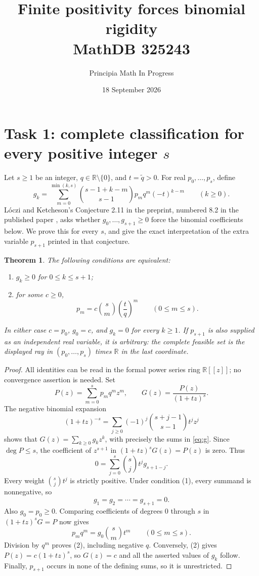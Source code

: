 \documentclass[11pt]{article}
\title{Finite positivity forces binomial rigidity\\\large MathDB 325243}
\author{Principia Math In Progress}
\date{18 September 2026}
\newtheorem{theorem}{Theorem}
\begin{document}
\maketitle

\section*{Task 1: complete classification for every positive integer $s$}
Let $s\ge1$ be an integer, $q\in\mathbb R\setminus\{0\}$, and
$t=\widetilde q>0$. For real $p_0,\ldots,p_s$, define
\begin{equation}\label{eq:g}
 g_k=\sum_{m=0}^{\min(k,s)}
 \binom{s-1+k-m}{s-1}p_mq^m(-t)^{k-m}\qquad(k\ge0).
\end{equation}
L\'oczi and Ketcheson's Conjecture 2.11 in the preprint, numbered
8.2 in the published paper \cite{LK}, asks whether
$g_0,\ldots,g_{s+1}\ge0$ force the binomial coefficients below.
We prove this for every $s$, and give the exact interpretation of
the extra variable $p_{s+1}$ printed in that conjecture.

\begin{theorem}\label{thm:main}
The following conditions are equivalent:
\begin{enumerate}
\item $g_k\ge0$ for $0\le k\le s+1$;
\item for some $c\ge0$,
\[
             p_m=c\binom{s}{m}\left(\frac tq\right)^m
                    \qquad(0\le m\le s).
\]
\end{enumerate}
In either case $c=p_0$, $g_0=c$, and $g_k=0$ for every $k\ge1$.
If $p_{s+1}$ is also supplied as an independent real variable,
it is arbitrary: the complete feasible set is the displayed ray
in $(p_0,\ldots,p_s)$ times $\mathbb R$ in the last coordinate.
\end{theorem}

\begin{proof}
All identities can be read in the formal power series ring
$\mathbb R[[z]]$; no convergence assertion is needed. Set
\[
 P(z)=\sum_{m=0}^s p_mq^m z^m,
 \qquad G(z)=\frac{P(z)}{(1+tz)^s}.
\]
The negative binomial expansion
\[
 (1+tz)^{-s}=\sum_{j\ge0}(-1)^j\binom{s+j-1}{s-1}t^jz^j
\]
shows that $G(z)=\sum_{k\ge0}g_kz^k$, with precisely the sums
in \eqref{eq:g}. Since $\deg P\le s$, the coefficient of $z^{s+1}$
in $(1+tz)^sG(z)=P(z)$ is zero. Thus
\begin{equation}\label{eq:certificate}
      0=\sum_{j=0}^s\binom{s}{j}t^j g_{s+1-j}.
\end{equation}
Every weight $\binom{s}{j}t^j$ is strictly positive.
Under condition (1), every summand is nonnegative, so
\[
                  g_1=g_2=\cdots=g_{s+1}=0.
\]
Also $g_0=p_0\ge0$. Comparing coefficients of degrees $0$ through
$s$ in $(1+tz)^sG=P$ now gives
\[
                 p_mq^m=g_0\binom{s}{m}t^m
                        \qquad(0\le m\le s).
\]
Division by $q^m$ proves (2), including negative $q$.
Conversely, (2) gives $P(z)=c(1+tz)^s$, so $G(z)=c$ and all
the asserted values of $g_k$ follow. Finally, $p_{s+1}$ occurs
in none of the defining sums, so it is unrestricted.
\end{proof}
\end{document}
